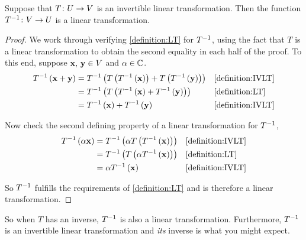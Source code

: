 \documentclass{ximera}
\begin{document}
\begin{theorem}
\label{theorem:ILTLT}


Suppose that $T\colon U\rightarrow V$ is an invertible linear transformation.  Then the function $T^{-1}\colon V\rightarrow U$ is a linear transformation.




\begin{proof}
We work through verifying \ref{definition:LT} for $T^{-1}$, using the fact that $T$ is a linear transformation to obtain the second equality in each half of the proof.  To this end, suppose $\mathbf{x},\,\mathbf{y}\in V$ and $\alpha\in\mathbb{C}$.
\begin{align*}
T^{-1}\left(\mathbf{x}+\mathbf{y}\right)&=
T^{-1}\left(T\left(T^{-1}\left(\mathbf{x}\right)\right)+T\left(T^{-1}\left(\mathbf{y}\right)\right)\right)
&&\ref{definition:IVLT}\\
&=T^{-1}\left(T\left(T^{-1}\left(\mathbf{x}\right)+T^{-1}\left(\mathbf{y}\right)\right)\right)&&\ref{definition:LT}\\
&=T^{-1}\left(\mathbf{x}\right)+T^{-1}\left(\mathbf{y}\right)
&&\ref{definition:IVLT}
\end{align*}




Now check the second defining property of a linear transformation for $T^{-1}$,
\begin{align*}
T^{-1}\left(\alpha\mathbf{x}\right)&=
T^{-1}\left(\alpha T\left(T^{-1}\left(\mathbf{x}\right)\right)\right)
&&\ref{definition:IVLT}\\
&=T^{-1}\left(T\left(\alpha T^{-1}\left(\mathbf{x}\right)\right)\right)
&&\ref{definition:LT}\\
&=\alpha T^{-1}\left(\mathbf{x}\right)
&&\ref{definition:IVLT}
\end{align*}




So $T^{-1}$ fulfills the requirements of \ref{definition:LT} and is therefore a linear transformation.


\end{proof}
\end{theorem}

So when $T$ has an inverse, $T^{-1}$ is also a linear transformation.  Furthermore, $T^{-1}$ is an invertible linear transformation and \textit{its} inverse is what you might expect.
\end{document}
